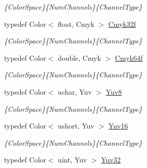 \begin{DoxyCompactItemize}
\begin{DoxyCompactList}\small\item\em \{Color\-Space\}\{Num\-Channels\}\{Channel\-Type\} \end{DoxyCompactList}\item 
\hypertarget{group___color_types_ga2385155db5bf2b8630c0a44a2a6ac2df}{typedef Color$<$ float, Cmyk $>$ \hyperlink{group___color_types_ga2385155db5bf2b8630c0a44a2a6ac2df}{Cmyk32f}}\label{group___color_types_ga2385155db5bf2b8630c0a44a2a6ac2df}

\begin{DoxyCompactList}\small\item\em \{Color\-Space\}\{Num\-Channels\}\{Channel\-Type\} \end{DoxyCompactList}\item 
\hypertarget{group___color_types_ga578705dd9b83fd2613f4aadf25aa5818}{typedef Color$<$ double, Cmyk $>$ \hyperlink{group___color_types_ga578705dd9b83fd2613f4aadf25aa5818}{Cmyk64f}}\label{group___color_types_ga578705dd9b83fd2613f4aadf25aa5818}

\begin{DoxyCompactList}\small\item\em \{Color\-Space\}\{Num\-Channels\}\{Channel\-Type\} \end{DoxyCompactList}\item 
\hypertarget{group___color_types_gadeeadd9272a7274e71f68ff195b5a200}{typedef Color$<$ uchar, Yuv $>$ \hyperlink{group___color_types_gadeeadd9272a7274e71f68ff195b5a200}{Yuv8}}\label{group___color_types_gadeeadd9272a7274e71f68ff195b5a200}

\begin{DoxyCompactList}\small\item\em \{Color\-Space\}\{Num\-Channels\}\{Channel\-Type\} \end{DoxyCompactList}\item 
\hypertarget{group___color_types_ga2ec923931f5a3e7cba53238fa7077396}{typedef Color$<$ ushort, Yuv $>$ \hyperlink{group___color_types_ga2ec923931f5a3e7cba53238fa7077396}{Yuv16}}\label{group___color_types_ga2ec923931f5a3e7cba53238fa7077396}

\begin{DoxyCompactList}\small\item\em \{Color\-Space\}\{Num\-Channels\}\{Channel\-Type\} \end{DoxyCompactList}\item 
\hypertarget{group___color_types_ga78e65cfa90e1266c219acefe30bfb483}{typedef Color$<$ uint, Yuv $>$ \hyperlink{group___color_types_ga78e65cfa90e1266c219acefe30bfb483}{Yuv32}}\label{group___color_types_ga78e65cfa90e1266c219acefe30bfb483}


\end{DoxyCompactItemize}
